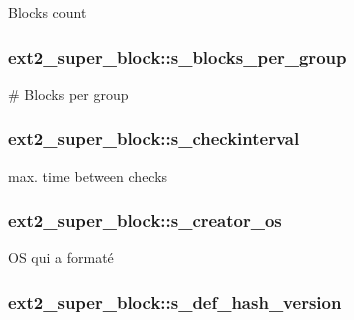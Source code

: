 \-Blocks count \hypertarget{structext2__super__block_a037ab0266050cd0d0026c5da1fda3ab1}{
\subsubsection[{s\-\_\-blocks\-\_\-per\-\_\-group}]{ {\bf ext2\-\_\-super\-\_\-block\-::s\-\_\-blocks\-\_\-per\-\_\-group}}}\label{structext2__super__block_a037ab0266050cd0d0026c5da1fda3ab1}
\# \-Blocks per group \hypertarget{structext2__super__block_a41729c3eb872813abe1489de88e6f736}{
\subsubsection[{s\-\_\-checkinterval}]{ {\bf ext2\-\_\-super\-\_\-block\-::s\-\_\-checkinterval}}}\label{structext2__super__block_a41729c3eb872813abe1489de88e6f736}
max. time between checks \hypertarget{structext2__super__block_a421f09691aa0911da60db7ef23dc30ca}{
\subsubsection[{s\-\_\-creator\-\_\-os}]{ {\bf ext2\-\_\-super\-\_\-block\-::s\-\_\-creator\-\_\-os}}}\label{structext2__super__block_a421f09691aa0911da60db7ef23dc30ca}
\-O\-S qui a formaté \hypertarget{structext2__super__block_a3120768bf3ac685a2e5d38d84ec3c5b8}{
\subsubsection[{s\-\_\-def\-\_\-hash\-\_\-version}]{ {\bf ext2\-\_\-super\-\_\-block\-::s\-\_\-def\-\_\-hash\-\_\-version}}}\label{structext2__super__block_a3120768bf3ac685a2e5d38d84ec3c5b8}
